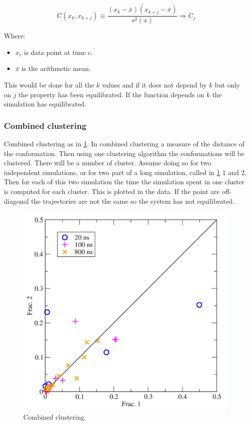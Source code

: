 		$$C(x_k, x_{k+j}) \equiv\frac{\bar{(x_k-\bar{x})(x_{k+j}-\bar{x})}}{s^2(x)}\Rightarrow C_j$$

		Where:

		\begin{multicols}{2}
			\begin{itemize}
				\item $x_c$ is data point at time $c$.
				\item $\bar{x}$ is the arithmetic mean.
			\end{itemize}
		\end{multicols}

		This would be done for all the $k$ values and if it does not depend by $k$ but only on $j$ the property has been equilibrated.
		If the function depends on $k$ the simulation has equilibrated.

		\subsubsection{Combined clustering}
		Combined clustering as in \ref{fig:independent_simulation}.
		In combined clustering a measure of the distance of the conformation.
		Then using one clustering algorithm the conformations will be clustered.
		There will be a number of cluster.
		Assume doing so for two independent simulations, or for two part of a long simulation, called in \ref{fig:independent_simulation} $1$ and $2$.
		Then for each of this two simulation the time the simulation spent in one cluster is computed for each cluster.
		This is plotted in the data.
		If the point are off-diagonal the trajectories are not the same so the system has not equilibrated.

		\begin{figure}[H]
			\centering
			\includegraphics[scale = 0.4]{independent-simulations}
			\caption{Combined clustering}
			\label{fig:independent_simulation}
		\end{figure}

